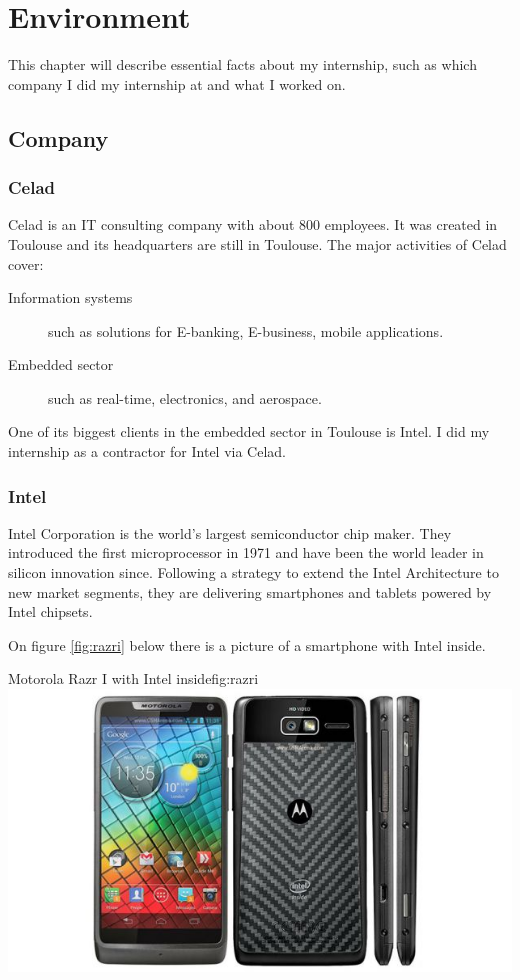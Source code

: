 \chapter{Environment}\label{chap:context}

\begin{sectionIntro}
    This chapter will describe essential facts about my internship, such as
    which company I did my internship at and what I worked on.
\end{sectionIntro}

\section{Company}

\subsection{Celad}
Celad is an IT consulting company with about 800 employees. It was created in Toulouse
and its headquarters are still in Toulouse.
The major activities of Celad cover:
\begin{description}
    \item [Information systems] such as solutions for E-banking, E-business, mobile applications.
    \item [Embedded sector] such as real-time, electronics, and aerospace.
\end{description}
One of its biggest clients in the embedded sector in Toulouse is Intel.
I did my internship as a contractor for Intel via Celad.

\subsection{Intel}
Intel Corporation is the world’s largest semiconductor chip maker. They
introduced the first microprocessor in 1971 and have been the world leader in
silicon innovation since.
Following a strategy to extend the Intel Architecture to new market segments,
they are delivering smartphones and tablets powered by Intel chipsets.

On figure \ref{fig:razri} below there is a picture of a smartphone with Intel inside.

\begin{figureGraphics}{Motorola Razr I with Intel inside}{fig:razri}
    \includegraphics[width=\textwidth]{./src/img/razri.jpg}
\end{figureGraphics}

